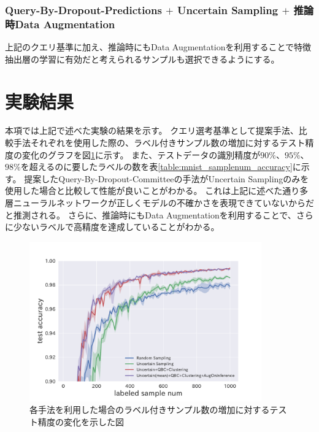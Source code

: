 \subsubsection{Query-By-Dropout-Predictions $+$ Uncertain Sampling $+$ 推論時Data Augmentation}
上記のクエリ基準に加え、推論時にもData Augmentationを利用することで特徴抽出層の学習に有効だと考えられるサンプルも選択できるようにする。

\section{実験結果}
本項では上記で述べた実験の結果を示す。
クエリ選考基準として提案手法、比較手法それぞれを使用した際の、ラベル付きサンプル数の増加に対するテスト精度の変化のグラフを図\ref{fig:mnist_acc_graph}に示す。
また、テストデータの識別精度が$90\%$、$95\%$、 $98\%$を超えるのに要したラベルの数を表\ref{table:mnist_samplenum_accuracy}に示す。
提案したQuery-By-Dropout-Committeeの手法がUncertain Samplingのみを使用した場合と比較して性能が良いことがわかる。
これは上記に述べた通り多層ニューラルネットワークが正しくモデルの不確かさを表現できていないからだと推測される。
さらに、推論時にもData Augmentationを利用することで、さらに少ないラベルで高精度を達成していることがわかる。

\begin{figure}[tbp]
    \label{fig:mnist_acc_graph}
     \begin{center}
      \includegraphics[width=10cm]{figures/mnist_acc_graph.pdf}
     \end{center}
    \caption{各手法を利用した場合のラベル付きサンプル数の増加に対するテスト精度の変化を示した図}
\end{figure}

